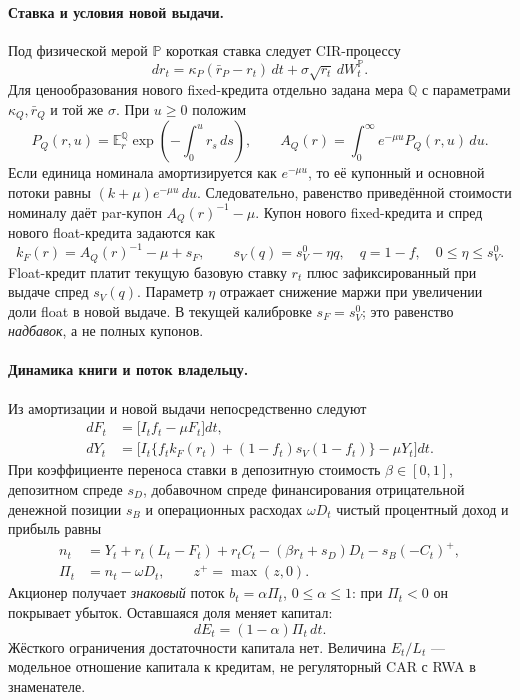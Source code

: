 \documentclass[11pt,a4paper]{article}
\newcommand{\E}{\mathbb E}
\newcommand{\Pp}{\mathbb P}
\newcommand{\Qq}{\mathbb Q}
\begin{document}
\paragraph{Ставка и условия новой выдачи.}
Под физической мерой $\Pp$ короткая ставка следует CIR-процессу
\begin{equation}
 dr_t=\kappa_P(\bar r_P-r_t)\,dt+\sigma\sqrt{r_t}\,dW_t^{\Pp}.
 \label{eq:rate}
\end{equation}
Для ценообразования нового fixed-кредита отдельно задана мера $\Qq$
с параметрами $\kappa_Q,\bar r_Q$ и той же $\sigma$.
При $u\geq0$ положим
\[
 P_Q(r,u)=\E_r^{\Qq}
 \exp\!\left(-\int_0^u r_s\,ds\right),\qquad
 A_Q(r)=\int_0^\infty e^{-\mu u}P_Q(r,u)\,du.
\]
Если единица номинала амортизируется как $e^{-\mu u}$, то её
купонный и основной потоки равны $(k+\mu)e^{-\mu u}\,du$.
Следовательно, равенство приведённой стоимости номиналу даёт
par-купон $A_Q(r)^{-1}-\mu$.
Купон нового fixed-кредита и спред нового float-кредита задаются как
\begin{equation}
 k_F(r)=A_Q(r)^{-1}-\mu+s_F,\qquad
 s_V(q)=s_V^0-\eta q,\quad q=1-f,\quad
 0\leq\eta\leq s_V^0 .
 \label{eq:pricing}
\end{equation}
Float-кредит платит текущую базовую ставку $r_t$ плюс
зафиксированный при выдаче спред $s_V(q)$.
Параметр $\eta$ отражает снижение маржи при увеличении доли float
в новой выдаче. В текущей калибровке $s_F=s_V^0$; это равенство
\emph{надбавок}, а не полных купонов.

\paragraph{Динамика книги и поток владельцу.}
Из амортизации и новой выдачи непосредственно следуют
\begin{align}
 dF_t&=\bigl[I_tf_t-\mu F_t\bigr]dt, \label{eq:F}\\
 dY_t&=\bigl[I_t\{f_tk_F(r_t)
 +(1-f_t)s_V(1-f_t)\}-\mu Y_t\bigr]dt. \label{eq:Y}
\end{align}
При коэффициенте переноса ставки в депозитную стоимость
$\beta\in[0,1]$, депозитном спреде $s_D$, добавочном спреде
финансирования отрицательной денежной позиции $s_B$ и
операционных расходах $\omega D_t$ чистый процентный доход и прибыль равны
\begin{align}
 n_t&=Y_t+r_t(L_t-F_t)+r_tC_t
       -(\beta r_t+s_D)D_t-s_B(-C_t)^+, \label{eq:nii}\\
 \Pi_t&=n_t-\omega D_t,\qquad z^+=\max(z,0). \label{eq:profit}
\end{align}
Акционер получает \emph{знаковый} поток $b_t=\alpha\Pi_t$,
$0\leq\alpha\leq1$: при $\Pi_t<0$ он покрывает убыток.
Оставшаяся доля меняет капитал:
\begin{equation}
 dE_t=(1-\alpha)\Pi_t\,dt. \label{eq:E}
\end{equation}
Жёсткого ограничения достаточности капитала нет.
Величина $E_t/L_t$ --- модельное отношение капитала к кредитам,
не регуляторный CAR с RWA в знаменателе.
\end{document}

